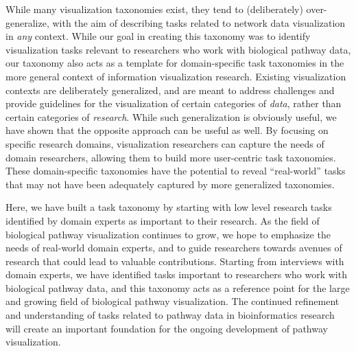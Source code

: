 \documentclass[twocolumn]{bmcart}%
\begin{document}
While many visualization taxonomies exist, they tend to (deliberately) over-generalize, with the aim of describing tasks related to network data visualization in \textit{any} context.
While our goal in creating this taxonomy was to identify visualization tasks relevant to researchers who work with biological pathway data, our taxonomy also acts as a template for domain-specific task taxonomies in the more general context of information visualization research.
Existing visualization contexts are deliberately generalized, and are meant to address challenges and provide guidelines for the visualization of certain categories of \textit{data}, rather than certain categories of \textit{research}.
While such generalization is obviously useful, we have shown that the opposite approach can be useful as well.
By focusing on specific research domains, visualization researchers can capture the needs of domain researchers, allowing them to build more user-centric task taxonomies.
These domain-specific taxonomies have the potential to reveal ``real-world'' tasks that may not have been adequately captured by more generalized taxonomies.

Here, we have built a task taxonomy by starting with low level research tasks identified by domain experts as important to their research.
As the field of biological pathway visualization continues to grow, we hope to emphasize the needs of real-world domain experts, and to guide researchers towards avenues of research that could lead to valuable contributions.
Starting from interviews with domain experts, we have identified tasks important to researchers who work with biological pathway data, and this taxonomy acts as a reference point for the large and growing field of biological pathway visualization.
The continued refinement and understanding of tasks related to pathway data in bioinformatics research will create an important foundation for the ongoing development of pathway visualization.

\end{document}
